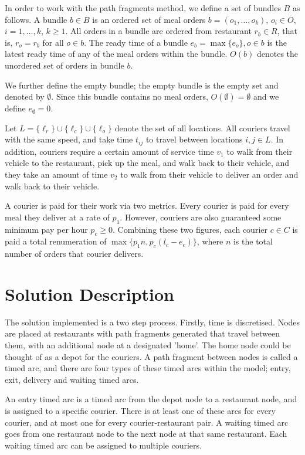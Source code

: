 \documentclass{article}
\begin{document}
In order to work with the path fragments method, we define a set of bundles $B$ as follows. A bundle $b\in B$ is an ordered set of meal orders $b=(o_1, \dots, o_k)$, $o_i\in O$, $i=1,\dots,k$, $k\geq 1$. All orders in a bundle are ordered from restaurant $r_b\in R$, that is, $r_o=r_b$ for all $o\in b$. The ready time of a bundle $e_b=\max\{e_o\}, o\in b$ is the latest ready time of any of the meal orders within the bundle. $O(b)$ denotes the unordered set of orders in bundle $b$.

We further define the empty bundle; the empty bundle is the empty set and denoted by $\emptyset$. Since this bundle contains no meal orders, $O(\emptyset)=\emptyset$ and we define $e_\emptyset=0$.

Let $L=\{\ell_r\}\cup\{\ell_c\}\cup\{\ell_o\}$ denote the set of all locations. All couriers travel with the same speed, and take time $t_{ij}$ to travel between locations $i,j\in L$. In addition, couriers require a certain amount of service time $v_1$ to walk from their vehicle to the restaurant, pick up the meal, and walk back to their vehicle, and they take an amount of time $v_2$ to walk from their vehicle to deliver an order and walk back to their vehicle.

A courier is paid for their work via two metrics. Every courier is paid for every meal they deliver at a rate of $p_1$. However, couriers are also guaranteed some minimum pay per hour $p_c\geq 0$. Combining these two figures, each courier $c\in C$ is paid a total renumeration of $\max\{p_1n, p_c(l_c-e_c)\}$, where $n$ is the total number of orders that courier delivers.

\section{Solution Description}

The solution implemented is a two step process. Firstly, time is discretised. Nodes are placed at restaurants with path fragments generated that travel between them, with an additional node at a designated 'home'. The home node could be thought of as a depot for the couriers. A path fragment between nodes is called a timed arc, and there are four types of these timed arcs within the model; entry, exit, delivery and waiting timed arcs.

An entry timed arc is a timed arc from the depot node to a restaurant node, and is assigned to a specific courier. There is at least one of these arcs for every courier, and at most one for every courier-restaurant pair. A waiting timed arc goes from one restaurant node to the next node at that same restaurant. Each waiting timed arc can be assigned to multiple couriers.
\end{document}
